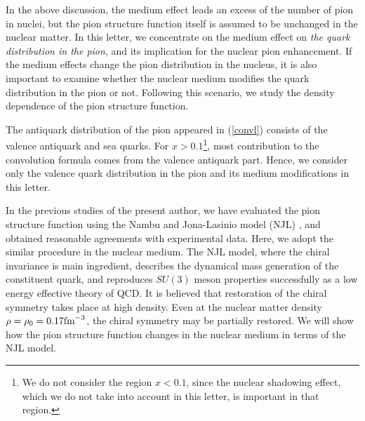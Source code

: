 In the above discussion, the medium effect leads an excess of the
number of pion in nuclei, but the pion
structure function itself is assumed to be unchanged in the
nuclear matter.
In this letter, we concentrate on the medium effect on {\em the quark
distribution
in the pion}, and its implication for the nuclear pion enhancement.
If the medium effects change the pion distribution in the nucleus,
it is
also important to examine whether the nuclear medium modifies
the quark distribution in the pion or not.
Following this scenario, we study the density dependence of the
pion structure function.

The antiquark distribution of the pion appeared in (\ref{convl})
consists of the valence antiquark and sea quarks.  For
$x>0.1$\footnote{ We do not consider the region $x< 0.1$, since
the nuclear shadowing effect, which we do not take into account
in this
letter, is important in that region.}, most contribution
to the convolution formula comes from the valence
antiquark part.  Hence, we consider only the valence quark distribution
in the pion and its medium modifications in this letter.


In the previous studies of the present author\cite{Shige1,Shige2},
we have evaluated the pion
structure function using the Nambu and Jona-Lasinio model (NJL)
\cite{NJL}, and obtained
reasonable agreements with experimental data.
Here, we adopt the similar procedure in the
nuclear medium.  The NJL model, where the chiral invariance is main
ingredient, describes the dynamical mass generation of the constituent
quark, and reproduces $SU(3)$ meson properties successfully
as a low energy effective theory of QCD\cite{Review_NJL}.
It is believed that restoration of the chiral symmetry takes place
at high density.  Even at the nuclear matter
density $\rho=\rho_0 = 0.17\mbox{fm} ^{-3}$, the chiral symmetry may
be partially restored.
We will show how the pion structure function changes in the nuclear
medium in terms of the NJL model.



\vspace{0.3cm}
